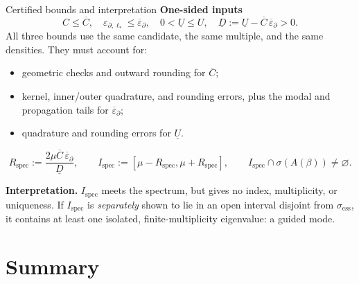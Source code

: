 \documentclass[aspectratio=169]{beamer}
\newcommand{\eps}{\varepsilon_{\partial,\ell_*}}
\begin{document}
\begin{frame}{Certified bounds and interpretation}
  \small
      \textbf{One-sided inputs}
      \[
        C\le\overline C,\quad\eps\le\overline\varepsilon_\partial,\quad
        0<\underline U\le U,\quad
        \underline D:=\underline U-\overline C\,\overline\varepsilon_\partial>0.
      \]
      All three bounds use the same candidate, the same multiple, and the same
      densities. They must account for:
      \begin{itemize}
        \item geometric checks and outward rounding for $\overline C$;
        \item kernel, inner/outer quadrature, and rounding errors, plus the modal and
          propagation tails for $\overline\varepsilon_\partial$;
        \item quadrature and rounding errors for $\underline U$.
      \end{itemize}
      \[
        R_{\mathrm{spec}}:=\frac{2\mu\overline C\,\overline\varepsilon_\partial}{\underline D},
        \qquad
        I_{\mathrm{spec}}:=[\mu-R_{\mathrm{spec}},\mu+R_{\mathrm{spec}}],
        \qquad
        I_{\mathrm{spec}}\cap\sigma(A(\beta))\neq\varnothing.
      \]

  \textbf{Interpretation.} $I_{\mathrm{spec}}$ meets the spectrum, but gives no index,
  multiplicity, or uniqueness. If $I_{\mathrm{spec}}$ is \emph{separately} shown to lie
  in an open interval disjoint from $\sigma_{\mathrm{ess}}$, it contains at least one
  isolated, finite-multiplicity eigenvalue: a guided mode.
\end{frame}

\section{Summary}
\end{document}
